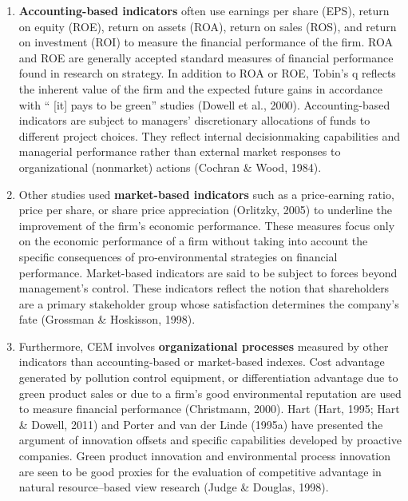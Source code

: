 \documentclass[]{article}
\begin{document}
\begin{enumerate}
\def\labelenumi{\arabic{enumi}.}
\item
  \textbf{Accounting-based indicators} often use earnings per share
  (EPS), return on equity (ROE), return on assets (ROA), return on sales
  (ROS), and return on investment (ROI) to measure the financial
  performance of the firm. ROA and ROE are generally accepted standard
  measures of financial performance found in research on strategy. In
  addition to ROA or ROE, Tobin's q reflects the inherent value of the
  firm and the expected future gains in accordance with `` {[}it{]} pays
  to be green'' studies (Dowell et al., 2000). Accounting-based
  indicators are subject to managers' discretionary allocations of funds
  to different project choices. They reflect internal decisionmaking
  capabilities and managerial performance rather than external market
  responses to organizational (nonmarket) actions (Cochran \& Wood,
  1984).
\item
  Other studies used \textbf{market-based indicators} such as a
  price-earning ratio, price per share, or share price appreciation
  (Orlitzky, 2005) to underline the improvement of the firm's economic
  performance. These measures focus only on the economic performance of
  a firm without taking into account the specific consequences of
  pro-environmental strategies on financial performance. Market-based
  indicators are said to be subject to forces beyond management's
  control. These indicators reflect the notion that shareholders are a
  primary stakeholder group whose satisfaction determines the company's
  fate (Grossman \& Hoskisson, 1998).
\item
  Furthermore, CEM involves \textbf{organizational processes} measured
  by other indicators than accounting-based or market-based indexes.
  Cost advantage generated by pollution control equipment, or
  differentiation advantage due to green product sales or due to a
  firm's good environmental reputation are used to measure financial
  performance (Christmann, 2000). Hart (Hart, 1995; Hart \& Dowell,
  2011) and Porter and van der Linde (1995a) have presented the argument
  of innovation offsets and specific capabilities developed by proactive
  companies. Green product innovation and environmental process
  innovation are seen to be good proxies for the evaluation of
  competitive advantage in natural resource--based view research (Judge
  \& Douglas, 1998).
\end{enumerate}
\end{document}
